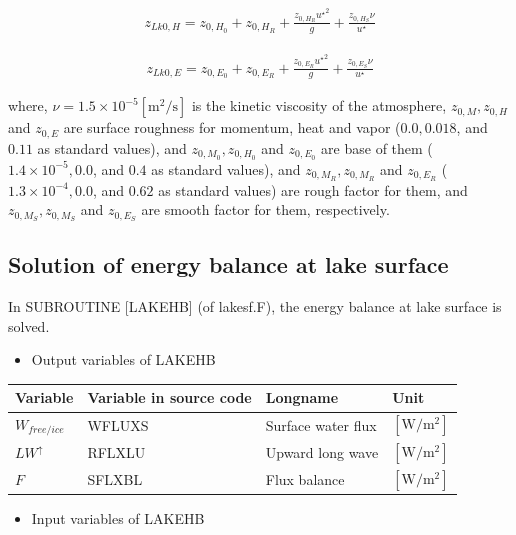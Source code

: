 \begin{eqnarray}
    z_{Lk0,H} = z_{0,H_0} + z_{0,H_R} + \frac{z_{0,H_R} {u^\star }^2 }{g} + \frac{z_{0,H_S}\nu }{u^\star}
\end{eqnarray}

\begin{eqnarray}
    z_{Lk0,E} = z_{0,E_0} + z_{0,E_R} + \frac{z_{0,E_R} {u^\star }^2 }{g} + \frac{z_{0,E_S}\nu }{u^\star}
\end{eqnarray}

where, \(\nu = 1.5 \times 10^{-5} \mathrm{[m^2/s]}\) is the kinetic viscosity of the atmosphere, \(z_{0,M},z_{0,H}\) and \(z_{0,E}\) are surface roughness for momentum, heat and vapor (\(0.0, 0.018\),
and \(0.11\) as standard values), and \(z_{0,M_0},z_{0,H_0}\) and \(z_{0,E_0}\) are base of them (\(1.4\times 10^{-5}, 0.0\), and \(0.4\) as standard values), and \(z_{0,M_R},z_{0,M_R}\) and
\(z_{0,E_R}\) (\(1.3\times10^{-4}, 0.0\), and \(0.62\) as standard values) are rough factor for them, and \(z_{0,M_S},z_{0,M_S}\) and \(z_{0,E_S}\) are smooth factor for them, respectively.

\hypertarget{solution-of-energy-balance-at-lake-surface}{%
\subsection{Solution of energy balance at lake surface}\label{solution-of-energy-balance-at-lake-surface}}

In SUBROUTINE {[}LAKEHB{]} (of lakesf.F), the energy balance at lake surface is solved.

\begin{itemize}
\tightlist
\item
  Output variables of LAKEHB
\end{itemize}

\begin{longtable}[]{@{}llll@{}}
\toprule
Variable & Variable in source code & Longname & Unit \\
\midrule
\endhead
\(W_{free/ice}\) & WFLUXS & Surface water flux & \(\mathrm{[W/m^2]}\) \\
\(LW^\uparrow\) & RFLXLU & Upward long wave & \(\mathrm{[W/m^2]}\) \\
\(F\) & SFLXBL & Flux balance & \(\mathrm{[W/m^2]}\) \\
\bottomrule
\end{longtable}

\begin{itemize}
\tightlist
\item
  Input variables of LAKEHB
\end{itemize}


